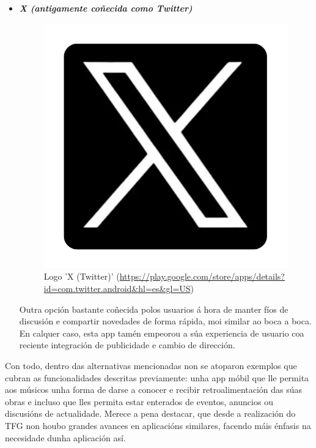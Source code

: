 \begin{itemize}	
	\item \textbf{\textit{X (antigamente coñecida como Twitter)}} 
	
	\begin{figure}[h!]
		\centering
		\includegraphics[scale=0.3]{06_imagenes/intro/x-twitter.png}
		\caption{Logo 'X (Twitter)' (\url{https://play.google.com/store/apps/details?id=com.twitter.android&hl=es&gl=US})}
	\end{figure}
	
	Outra opción bastante coñecida  polos usuarios á hora de manter fíos de discusión e compartir novedades de forma rápida, moi similar ao boca a boca. En calquer caso, esta app tamén empeorou a súa experiencia de usuario coa reciente integración de publicidade e cambio de dirección.
	
\end{itemize}

Con todo, dentro das alternativas mencionadas non se atoparon exemplos que cubran as funcionalidades descritas previamente: unha app móbil que lle permita aos músicos unha forma de darse a conocer e recibir retroalimentación das súas obras e incluso que lles permita estar enterados de eventos, anuncios ou discusións de actualidade. Merece a pena destacar, que desde a realización do TFG \cite{TFGLuis} non houbo grandes avances en aplicacións similares, facendo máis énfasis na necesidade dunha aplicación así.

